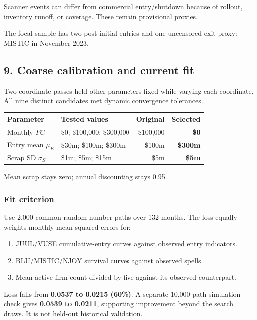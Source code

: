 \documentclass[11pt,]{article}
\providecommand{\tightlist}{%
  \setlength{\itemsep}{0pt}\setlength{\parskip}{0pt}}
\begin{document}
Scanner events can differ from commercial entry/shutdown because of
rollout, inventory runoff, or coverage. These remain provisional
proxies.

The focal sample has two post-initial entries and one uncensored exit
proxy: MISTIC in November 2023.

\clearpage

\subsection{9. Coarse calibration and current
fit}\label{coarse-calibration-and-current-fit}

Two coordinate passes held other parameters fixed while varying each
coordinate. All nine distinct candidates met dynamic convergence
tolerances.

\begin{longtable}[]{@{}llrr@{}}
\toprule
Parameter & Tested values & Original & Selected\tabularnewline
\midrule
\endhead
Monthly \(FC\) & \$0; \$100,000; \$300,000 & \$100,000 &
\textbf{\$0}\tabularnewline
Entry mean \(\mu_E\) & \$30m; \$100m; \$300m & \$100m &
\textbf{\$300m}\tabularnewline
Scrap SD \(\sigma_S\) & \$1m; \$5m; \$15m & \$5m &
\textbf{\$5m}\tabularnewline
\bottomrule
\end{longtable}

Mean scrap stays zero; annual discounting stays 0.95.

\subsubsection{Fit criterion}\label{fit-criterion}

Use 2,000 common-random-number paths over 132 months. The loss equally
weights monthly mean-squared errors for:

\begin{enumerate}
\def\labelenumi{\arabic{enumi}.}
\tightlist
\item
  JUUL/VUSE cumulative-entry curves against observed entry indicators.
\item
  BLU/MISTIC/NJOY survival curves against observed spells.
\item
  Mean active-firm count divided by five against its observed
  counterpart.
\end{enumerate}

Loss falls from \textbf{0.0537 to 0.0215 (60\%)}. A separate 10,000-path
simulation check gives \textbf{0.0539 to 0.0211}, supporting improvement
beyond the search draws. It is not held-out historical validation.
\end{document}
